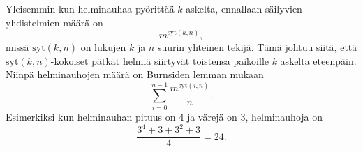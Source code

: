 Yleisemmin kun helminauhaa pyörittää $k$ askelta,
ennallaan säilyvien yhdistelmien määrä on
\[m^{\textrm{syt}(k,n)},\]
missä $\textrm{syt}(k,n)$ on lukujen $k$ ja $n$
suurin yhteinen tekijä.
Tämä johtuu siitä, että $\textrm{syt}(k,n)$-kokoiset
pätkät helmiä siirtyvät toistensa paikoille
$k$ askelta eteenpäin.
Niinpä helminauhojen määrä on
Burnsiden lemman mukaan
\[\sum_{i=0}^{n-1} \frac{m^{\textrm{syt}(i,n)}}{n}. \]
Esimerkiksi kun helminauhan pituus on 4
ja värejä on 3, helminauhoja on
\[\frac{3^4+3+3^2+3}{4} = 24. \]

